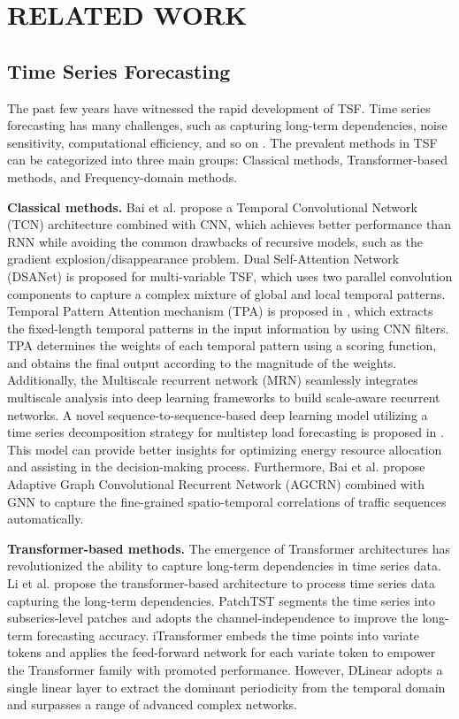 \section{RELATED WORK}
\label{sec:Related Work}
\subsection{Time Series Forecasting}
The past few years have witnessed the rapid development of TSF. Time series forecasting has many challenges, such as capturing long-term dependencies, noise sensitivity, computational efficiency, and so on \cite{nie2022time,eldeletslanet}. The prevalent methods in TSF can be categorized into three main groups: Classical methods, Transformer-based methods, and Frequency-domain methods.

\textbf{Classical methods.} Bai et al. \cite{bai2018empirical} propose a Temporal Convolutional Network (TCN) architecture combined with CNN, which achieves better performance than RNN while avoiding the common drawbacks of recursive models, such as the gradient explosion/disappearance problem.
Dual Self-Attention Network (DSANet) \cite{huang2019dsanet} is proposed for multi-variable TSF, which uses two parallel convolution components to capture a complex mixture of global and local temporal patterns.
Temporal Pattern Attention mechanism (TPA) is proposed in \cite{shih2019temporal}, which extracts the fixed-length temporal patterns in the input information by using CNN filters. TPA determines the weights of each temporal pattern using a scoring function, and obtains the final output according to the magnitude of the weights.
Additionally, the Multiscale recurrent network (MRN) \cite{guo2023multivariate} seamlessly integrates multiscale analysis into deep learning frameworks to build scale-aware recurrent networks.
A novel sequence-to-sequence-based deep learning model utilizing a time series decomposition strategy for multistep load forecasting is proposed in \cite{lu2024novel}. This model can provide better insights for optimizing energy resource allocation and assisting in the decision-making process.
Furthermore, Bai et al. \cite{bai2020adaptive} propose Adaptive Graph Convolutional Recurrent Network (AGCRN) combined with GNN to capture the fine-grained spatio-temporal correlations of traffic sequences automatically.

\textbf{Transformer-based methods.} The emergence of Transformer architectures has revolutionized the ability to capture long-term dependencies in time series data. Li et al. \cite{li2019enhancing} propose the transformer-based architecture to process time series data capturing the long-term dependencies. PatchTST \cite{nie2022time} segments the time series into subseries-level patches and adopts the channel-independence to improve the long-term forecasting accuracy. iTransformer \cite{liu2024itransformer} embeds the time points into variate tokens and applies the feed-forward network for each variate token to empower the Transformer family with promoted performance. However, DLinear \cite{zeng2023transformers} adopts a single linear layer to extract the dominant periodicity from the temporal domain and surpasses a range of advanced complex networks.

